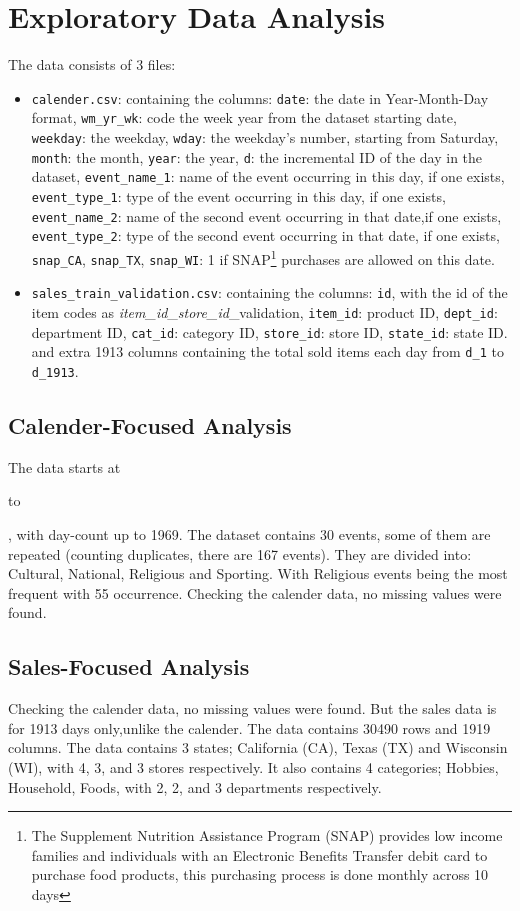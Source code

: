 \documentclass[11pt]{article}
\begin{document}
\section{Exploratory Data Analysis}
The data consists of 3 files: \begin{itemize}
    \item \texttt{calender.csv}: containing the columns: \texttt{date}: the date in Year-Month-Day format, \texttt{wm\_yr\_wk}: code the week year from the dataset starting date, \texttt{weekday}: the weekday, \texttt{wday}: the weekday's number, starting from Saturday, \texttt{month}: the month, \texttt{year}: the year, \texttt{d}: the incremental ID of the day in the dataset, \texttt{event\_name\_1}: name of the event occurring in this day, if one exists, \texttt{event\_type\_1}: type of the event occurring in this day, if one exists, \texttt{event\_name\_2}: name of the second event occurring in that date,if one exists, \texttt{event\_type\_2}: type of the second event occurring in that date, if one exists, \texttt{snap\_CA}, \texttt{snap\_TX}, \texttt{snap\_WI}: 1 if SNAP\footnote{The Supplement Nutrition 
    Assistance Program (SNAP) provides low income families and individuals with an Electronic Benefits Transfer 
    debit card to purchase food products, this purchasing process is done monthly across 10 days} purchases are allowed on this date.
    \item \texttt{sales\_train\_validation.csv}: containing the columns: \texttt{id}, with the id of the item codes as \textit{item\_id}\_\textit{store\_id}\_validation, \texttt{item\_id}: product ID, \texttt{dept\_id}: department ID,
    \texttt{cat\_id}: category ID, \texttt{store\_id}: store ID, \texttt{state\_id}: state ID. and extra 1913 columns containing the total sold items each day from \texttt{d\_1} to \texttt{d\_1913}.
\end{itemize}
\subsection{Calender-Focused Analysis}
The data starts at \date{January 29, 2011} to \date{June 19, 2016}, with day-count up to 1969. The dataset contains 30 events, some of them are repeated (counting duplicates, there are 167 events). They are divided into: Cultural, National, Religious and Sporting. With Religious events being the most frequent with 55 occurrence. Checking the calender data, no missing values were found.
\subsection{Sales-Focused Analysis}
Checking the calender data, no missing values were found. But the sales data is for 1913 days only,unlike the calender. The data contains 30490 rows and 1919 columns. The data contains 3 states; California (CA), Texas (TX) and Wisconsin (WI), with 4, 3, and 3 stores respectively. It also contains 4 categories; Hobbies, Household, Foods, with 2, 2, and 3 departments respectively.
\end{document}
